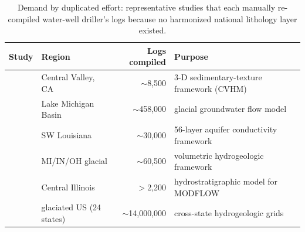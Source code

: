 \documentclass[12pt]{article}
\begin{document}
\begin{table}[t]\centering\small
\caption{Demand by duplicated effort: representative studies that each manually re-compiled water-well
driller's logs because no harmonized national lithology layer existed.}
\label{tab:demand}
\begin{tabularx}{\textwidth}{l l r Y}
\toprule
Study & Region & Logs compiled & Purpose \\
\midrule
\citet{faunt2010} & Central Valley, CA & $\sim$8{,}500 & 3-D sedimentary-texture framework (CVHM) \\
\citet{arihood2009} & Lake Michigan Basin & $\sim$458{,}000 & glacial groundwater flow model \\
\citet{vahdat2021} & SW Louisiana & $\sim$30{,}000 & 56-layer aquifer conductivity framework \\
\citet{riddle2025} & MI/IN/OH glacial & $\sim$60{,}500 & volumetric hydrogeologic framework \\
\citet{herzog2003} & Central Illinois & $>$2{,}200 & hydrostratigraphic model for MODFLOW \\
\citet{bayless2017} & glaciated US (24 states) & $\sim$14{,}000{,}000 & cross-state hydrogeologic grids \\
\bottomrule
\end{tabularx}
\end{table}
\end{document}

